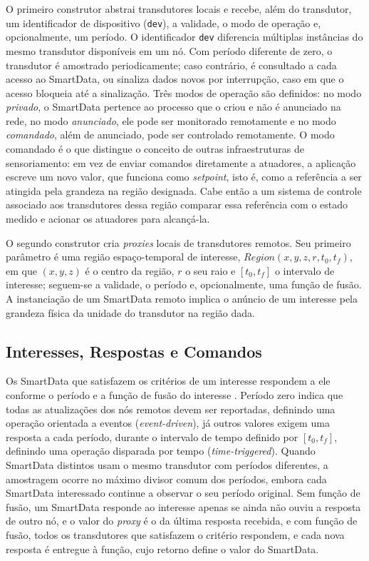 \documentclass[
    12pt,
    oneside,
    a4paper,
    chapter=TITLE,
    section=TITLE,
    english,
    brazil
]{abntex2}
\begin{document}
O primeiro construtor abstrai transdutores locais e recebe, além do
transdutor, um identificador de dispositivo (\texttt{dev}), a validade, o
modo de operação e, opcionalmente, um período. O identificador
\texttt{dev} diferencia múltiplas instâncias do mesmo transdutor
disponíveis em um nó. Com período diferente de zero, o transdutor é
amostrado periodicamente; caso contrário, é consultado a cada acesso ao
SmartData, ou sinaliza dados novos por interrupção, caso em que o acesso
bloqueia até a sinalização. Três modos de operação são definidos: no modo
\emph{privado}, o SmartData pertence ao processo que o criou e não é
anunciado na rede, no modo \emph{anunciado}, ele pode ser monitorado
remotamente e no modo \emph{comandado}, além de anunciado, pode ser
controlado remotamente. O modo comandado é o que distingue o conceito de
outras infraestruturas de sensoriamento: em vez de enviar comandos
diretamente a atuadores, a aplicação escreve um novo valor, que funciona
como \textit{setpoint}, isto é, como a referência a ser atingida pela
grandeza na região designada. Cabe então a um sistema de controle
associado aos transdutores dessa região comparar essa referência com o
estado medido e acionar os atuadores para alcançá-la.

O segundo construtor cria \emph{proxies} locais de transdutores remotos.
Seu primeiro parâmetro é uma região espaço-temporal de interesse,
\(\mathit{Region}(x, y, z, r, t_0, t_f)\), em que \((x, y, z)\) é o centro
da região, \(r\) o seu raio e \([t_0, t_f]\) o intervalo de interesse;
seguem-se a validade, o período e, opcionalmente, uma função de fusão. A
instanciação de um SmartData remoto implica o anúncio de um interesse
pela grandeza física da unidade do transdutor na região dada.

\subsection{Interesses, Respostas e Comandos}
\label{sec:sd-dinamica}
Os SmartData que satisfazem os critérios de um interesse respondem a ele
conforme o período e a função de fusão do interesse
\cite{frohlich2018smartdata}. Período zero indica que todas as
atualizações dos nós remotos devem ser reportadas, definindo uma operação
orientada a eventos (\textit{event-driven}), já outros valores exigem uma
resposta a cada período, durante o intervalo de tempo definido por
\([t_0, t_f]\), definindo uma operação
disparada por tempo (\textit{time-triggered}). Quando SmartData distintos
usam o mesmo transdutor com períodos diferentes, a amostragem ocorre no
máximo divisor comum dos períodos, embora cada SmartData interessado
continue a observar
o seu período original. Sem função de fusão, um SmartData responde ao
interesse apenas se ainda não ouviu a resposta de outro nó, e o valor do
\textit{proxy} é o da última resposta recebida, e com função de fusão,
todos os transdutores que satisfazem o critério respondem, e cada nova
resposta é entregue à função, cujo retorno define o valor do SmartData.
\end{document}
